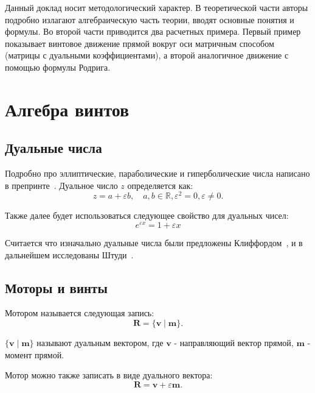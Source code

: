 \documentclass[%
]{ittmm}
\begin{document}
Данный доклад носит методологический характер. В теоретической части авторы подробно излагают 
алгебраическую часть теории, вводят основные понятия и формулы. Во второй части приводится два расчетных
примера. Первый пример показывает винтовое движение прямой вокруг оси матричным способом 
(матрицы с дуальными коэффициентами), а второй аналогичное движение с помощью формулы Родрига.

\section{Алгебра винтов}

\subsection{Дуальные числа}
Подробно про эллиптические, параболические и гиперболические числа написано в препринте~\cite{gevorkyanApproachesImplementationGeneralized2020}.
Дуальное число $z$ определяется как:
\begin{equation*}
  z=a+\varepsilon b, \quad a,b \in \mathbb{R}, \varepsilon^2=0, \varepsilon \ne 0.  
\end{equation*}

Также далее будет использоваться следующее свойство для дуальных чисел:
\begin{equation*}
  e^{\varepsilon x} = 1 + \varepsilon x
\end{equation*}

Считается что изначально дуальные числа были предложены Клиффордом~\cite{cliffordPreliminarySketchBiquaternions1871},
и в дальнейшем исследованы Штуди~\cite{zindlerGeometrieDynamenStudy1903}.

\subsection{Моторы и винты}

Мотором называется следующая запись: 
\begin{equation*}
  \mathbf{R} = \{ \mathbf{v} \mid \mathbf{m} \}.
\end{equation*}

$\{\mathbf{v} \mid \mathbf{m}\}$ называют дуальным вектором, где $\mathbf{v}$ - направляющий вектор прямой,
 $\mathbf{m}$ - момент прямой.

Мотор можно также записать в виде дуального вектора: 
\begin{equation*}
  \mathbf{R} = \mathbf{v} + \varepsilon \mathbf{m}.
\end{equation*}
\end{document}
